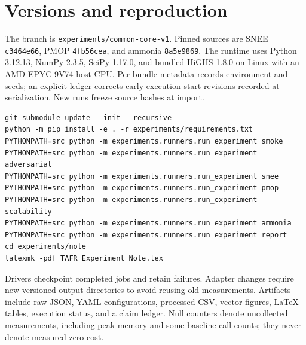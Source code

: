 \documentclass[11pt]{article}
\begin{document}
\appendix\section{Versions and reproduction}
The branch is \texttt{experiments/common-core-v1}.
Pinned sources are SNEE \texttt{c3464e66}, PMOP \texttt{4fb56cea}, and ammonia \texttt{8a5e9869}.
The runtime uses Python 3.12.13, NumPy 2.3.5, SciPy 1.17.0, and bundled HiGHS 1.8.0 on Linux with an AMD EPYC 9V74 host CPU.
Per-bundle metadata records environment and seeds; an explicit ledger corrects early execution-start revisions recorded at serialization.
New runs freeze source hashes at import.
\begin{verbatim}
git submodule update --init --recursive
python -m pip install -e . -r experiments/requirements.txt
PYTHONPATH=src python -m experiments.runners.run_experiment smoke
PYTHONPATH=src python -m experiments.runners.run_experiment adversarial
PYTHONPATH=src python -m experiments.runners.run_experiment snee
PYTHONPATH=src python -m experiments.runners.run_experiment pmop
PYTHONPATH=src python -m experiments.runners.run_experiment scalability
PYTHONPATH=src python -m experiments.runners.run_experiment ammonia
PYTHONPATH=src python -m experiments.runners.run_experiment report
cd experiments/note
latexmk -pdf TAFR_Experiment_Note.tex
\end{verbatim}
Drivers checkpoint completed jobs and retain failures.
Adapter changes require new versioned output directories to avoid reusing old measurements.
Artifacts include raw JSON, YAML configurations, processed CSV, vector figures, LaTeX tables, execution status, and a claim ledger.
Null counters denote uncollected measurements, including peak memory and some baseline call counts; they never denote measured zero cost.
\end{document}
